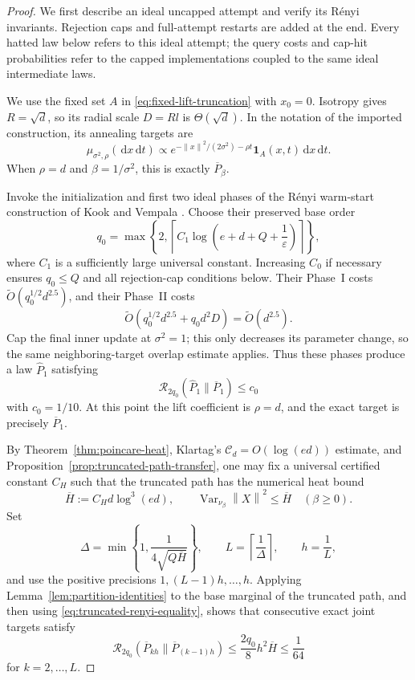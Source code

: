 \documentclass[11pt]{article}
\theoremstyle{remark}
\newcommand{\1}{\bm 1}
\newcommand{\eps}{\varepsilon}
\newcommand{\Var}{\operatorname{Var}}
\newcommand{\dd}{\,\mathrm d}
\newcommand{\norm}[1]{\left\lVert #1\right\rVert}
\begin{document}
\begin{proof}
We first describe an ideal uncapped attempt and verify its R\'enyi
invariants.  Rejection caps and full-attempt restarts are added at the
end.  Every hatted law below refers to this ideal attempt; the query
costs and cap-hit probabilities refer to the capped implementations
coupled to the same ideal intermediate laws.

We use the fixed set $A$ in \eqref{eq:fixed-lift-truncation} with
$x_0=0$.  Isotropy gives $R=\sqrt d$, so its radial scale
$D=Rl$ is $\Theta(\sqrt d)$.  In the notation of the imported
construction, its annealing targets are
\begin{equation}\label{eq:KV-lift-targets}
  \mu_{\sigma^2,\rho}(\dd x\dd t)
  \propto
  e^{-\norm x^2/(2\sigma^2)-\rho t}\1_A(x,t)\dd x\dd t.
\end{equation}
When $\rho=d$ and $\beta=1/\sigma^2$, this is exactly
$\overline P_\beta$.

Invoke the initialization and first two
ideal phases of the R\'enyi warm-start construction of Kook and Vempala
\citep[Section~5.2]{KV26zeroth}.  Choose their preserved base order
\[
  q_0=\max\left\{2,
    \left\lceil C_1\log\!\left(e+d+Q+\frac1\eps\right)\right\rceil
  \right\},
\]
where $C_1$ is a sufficiently large universal constant.  Increasing
$C_0$ if necessary ensures $q_0\leq Q$ and all rejection-cap
conditions below.  Their Phase~I costs
$\widetilde O(q_0^{1/2}d^{2.5})$, and their Phase~II costs
\[
  \widetilde O\!\left(q_0^{1/2}d^{2.5}+q_0d^2D\right)
  =\widetilde O(d^{2.5}).
\]
Cap the final inner update at $\sigma^2=1$; this only decreases its
parameter change, so the same neighboring-target overlap estimate
applies.
Thus these phases produce a law $\widehat P_1$ satisfying
\begin{equation}\label{eq:phase-two-invariant}
  \mathcal R_{2q_0}(\widehat P_1\|\overline P_1)\leq c_0
\end{equation}
with $c_0=1/10$.  At this point the
lift coefficient is $\rho=d$, and the exact target is precisely
$\overline P_1$.

By Theorem~\ref{thm:poincare-heat}, Klartag's
$\mathcal C_d=O(\log(ed))$ estimate, and
Proposition~\ref{prop:truncated-path-transfer}, one may fix a universal
certified constant $C_H$ such that the truncated path has the numerical
heat bound
\begin{equation}\label{eq:truncated-Hbar}
  \overline H:=C_Hd\log^3(ed),
  \qquad
  \Var_{\nu_\beta}\norm X^2\leq\overline H
  \quad(\beta\geq0).
\end{equation}
Set
\[
  \Delta=\min\left\{1,\frac1{4\sqrt{Q\overline H}}\right\},
  \qquad L=\left\lceil\frac1\Delta\right\rceil,
  \qquad h=\frac1L,
\]
and use the positive precisions $1,(L-1)h,\ldots,h$.  Applying
Lemma~\ref{lem:partition-identities} to the base marginal of the
truncated path, and then using
\eqref{eq:truncated-renyi-equality}, shows that consecutive exact joint
targets satisfy
\begin{equation}\label{eq:truncated-neighbor-overlap}
  \mathcal R_{2q_0}(\overline P_{kh}\|\overline P_{(k-1)h})
  \leq\frac{2q_0}{8}h^2\overline H
  \leq\frac1{64}
\end{equation}
for $k=2,\ldots,L$.


\end{proof}
\end{document}
